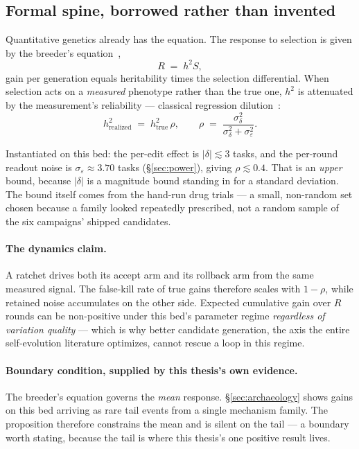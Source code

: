 \subsection*{Formal spine, borrowed rather than invented}

Quantitative genetics already has the equation. The response to selection
is given by the breeder's equation~\cite{falconer-mackay},
\[
  R \;=\; h^2 S ,
\]
gain per generation equals heritability times the selection differential.
When selection acts on a \emph{measured} phenotype rather than the true
one, $h^2$ is attenuated by the measurement's reliability --- classical
regression dilution~\cite{hutcheon-dilution}:
\[
  h^2_{\text{realized}} \;=\; h^2_{\text{true}}\,\rho ,
  \qquad
  \rho \;=\; \frac{\sigma^2_{\delta}}{\sigma^2_{\delta}+\sigma^2_{\varepsilon}} .
\]

Instantiated on this bed: the per-edit effect is $|\delta| \lesssim 3$
tasks, and the per-round readout noise is $\sigma_\varepsilon \approx
3.70$ tasks (\S\ref{sec:power}), giving $\rho \lesssim 0.4$. That is
an \emph{upper} bound, because $|\delta|$ is a magnitude bound standing in
for a standard deviation. The bound itself comes from the hand-run drug
trials  --- a small, non-random set chosen because a family
looked repeatedly prescribed, not a random sample of the six campaigns'
shipped candidates.

\paragraph{The dynamics claim.} A ratchet drives both its accept arm and
its rollback arm from the same measured signal. The false-kill rate of true
gains therefore scales with $1-\rho$, while retained noise accumulates on
the other side. Expected cumulative gain over $R$ rounds can be non-positive under this
bed's parameter regime \emph{regardless of variation quality} --- which is why better
candidate generation, the axis the entire self-evolution literature
optimizes, cannot rescue a loop in this regime.

\paragraph{Boundary condition, supplied by this thesis's own evidence.} The
breeder's equation governs the \emph{mean} response.
\S\ref{sec:archaeology} shows gains on this bed arriving as rare tail
events from a single mechanism family. The proposition therefore constrains
the mean and is silent on the tail --- a boundary worth stating, because
the tail is where this thesis's one positive result lives.

